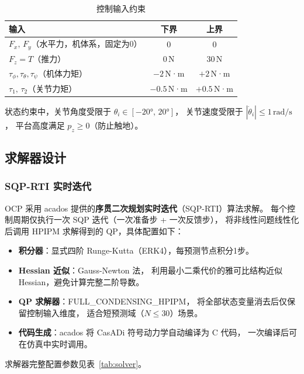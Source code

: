 \begin{table}[h]
\centering
\caption{控制输入约束}
\label{tab:input_bounds}
\begin{tabular}{lcc}
\hline
\textbf{输入} & \textbf{下界} & \textbf{上界} \\
\hline
$F_x,\,F_y$（水平力，机体系，固定为0）           & 0         & 0 \\
$F_z = T$（推力）                                & 0\,N      & 30\,N \\
$\tau_\phi,\tau_\theta,\tau_\psi$（机体力矩）     & $-2$\,N·m & $+2$\,N·m \\
$\tau_1,\,\tau_2$（关节力矩）                     & $-0.5$\,N·m & $+0.5$\,N·m \\
\hline
\end{tabular}
\end{table}

状态约束中，关节角度受限于 $\theta_i\in[-20°,\,20°]$，
关节速度受限于 $|\dot\theta_i|\leq 1\,\mathrm{rad/s}$，
平台高度满足 $p_z\geq 0$（防止触地）。

\subsection{求解器设计}

\subsubsection{SQP-RTI 实时迭代}

OCP 采用 acados 提供的\textbf{序贯二次规划实时迭代}（SQP-RTI）算法求解。
每个控制周期仅执行一次 SQP 迭代（一次准备步 + 一次反馈步），
将非线性问题线性化后调用 HPIPM 求解得到的 QP，具体配置如下：

\begin{itemize}
    \item \textbf{积分器}：显式四阶 Runge-Kutta（ERK4），每预测节点积分1步。
    \item \textbf{Hessian 近似}：Gauss-Newton 法，
          利用最小二乘代价的雅可比结构近似 Hessian，避免计算完整二阶导数。
    \item \textbf{QP 求解器}：FULL\_CONDENSING\_HPIPM，
          将全部状态变量消去后仅保留控制输入维度，
          适合短预测域（$N \leq 30$）场景。
    \item \textbf{代码生成}：acados 将 CasADi 符号动力学自动编译为 C 代码，
          一次编译后可在仿真中实时调用。
\end{itemize}

求解器完整配置参数见表~\ref{tab:solver}。

